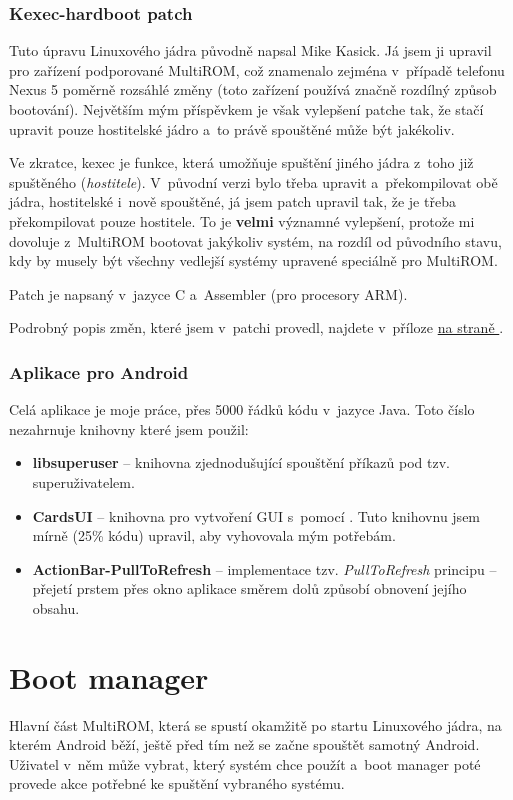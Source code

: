 \documentclass[12pt, a4paper, oneside]{article}
\newcommand{\B}{\textbf} %
\newcommand{\It}{\textit}  %
\newcommand*{\attref}[1]{\hyperref[{#1}]{\uv{\nameref*{#1}} na straně \pageref{#1}}}
\begin{document}
\subsubsection{Kexec-hardboot patch}
Tuto úpravu Linuxového jádra původně napsal Mike Kasick\cite{kexec-hardboot-orig}. Já jsem ji upravil pro zařízení podporované MultiROM, což znamenalo zejména v~případě telefonu Nexus 5 poměrně rozsáhlé změny (toto zařízení používá značně rozdílný způsob bootování). Největším mým příspěvkem je však vylepšení patche tak, že stačí upravit pouze hostitelské jádro a~to právě spouštěné může být jakékoliv.

Ve zkratce, kexec je funkce, která umožňuje spuštění jiného jádra z~toho již spuštěného (\It{hostitele}). V~původní verzi bylo třeba upravit a~překompilovat obě jádra, hostitelské i~nově spouštěné, já jsem patch upravil tak, že je třeba překompilovat pouze hostitele. To je \B{velmi} významné vylepšení, protože mi dovoluje z~MultiROM bootovat jakýkoliv systém, na rozdíl od původního stavu, kdy by musely být všechny vedlejší systémy upravené speciálně pro MultiROM.

Patch je napsaný v~jazyce C a~Assembler (pro procesory ARM).

Podrobný popis změn, které jsem v~patchi provedl, najdete v~příloze \attref{sec:kexec-hardboot}.

\subsubsection{Aplikace pro Android}
Celá aplikace je moje práce, přes 5000 řádků kódu v~jazyce Java. Toto číslo nezahrnuje knihovny které jsem použil:
\begin{itemize}
    \item \B{libsuperuser} -- knihovna zjednodušující spouštění příkazů pod tzv. superuživatelem.
    \item \B{CardsUI} -- knihovna pro vytvoření GUI s~pomocí . Tuto knihovnu jsem mírně (25\% kódu) upravil, aby vyhovovala mým potřebám.
    \item \B{ActionBar-PullToRefresh} -- implementace tzv. \It{PullToRefresh} principu -- přejetí prstem přes okno aplikace směrem dolů způsobí obnovení jejího obsahu.
\end{itemize}

\newpage
\section{Boot manager}
Hlavní část MultiROM, která se spustí okamžitě po startu Linuxového jádra, na kterém Android běží, ještě před tím než se začne spouštět samotný Android. Uživatel v~něm může vybrat, který systém chce použít a~boot manager poté provede akce potřebné ke spuštění vybraného systému.
\end{document}
